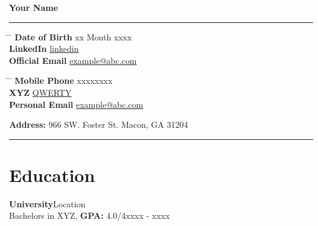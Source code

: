 \documentclass[11pt]{article}
\begin{document}
{\centering
\color{battleshipgrey}
{\bf\huge Your Name}\\
\rule{19cm}{0.5pt}}

\indent
\parbox{\textwidth}{ 
	\begin{tabbing}
		\hspace{4cm} \= \hspace{4cm} \= \kill 
		{\bf Date of Birth} \> xx Month xxxx \\
		{\bf LinkedIn} \> \href{linkedin}{linkedin} \\ 
		{\bf Official Email} \> \href{mailto:example@abc.com}{example@abc.com} 
	\end{tabbing}
}
\indent\indent\indent %
\parbox{\textwidth}{ 
	\begin{tabbing} 
		\hspace{4cm} \= \hspace{4cm} \= \kill 
		{\bf Mobile Phone} \> xxxxxxxx \\
		{\bf XYZ} \> \href{ABC}{QWERTY} \\ 
		{\bf Personal Email} \> \href{mailto:example@abc.com}{example@abc.com} 
	\end{tabbing}
}
{\centering
{\bf Address:} 966 SW. Foster St. Macon, GA 31204\\
}
{\centering
\color{battleshipgrey}
\rule{19cm}{0.5pt}}

\section{Education}
	{\bf University}\hfill Location\\
	Bachelors in XYZ, {\bf GPA:} 4.0/4\hfill xxxx - xxxx 
\end{document}
